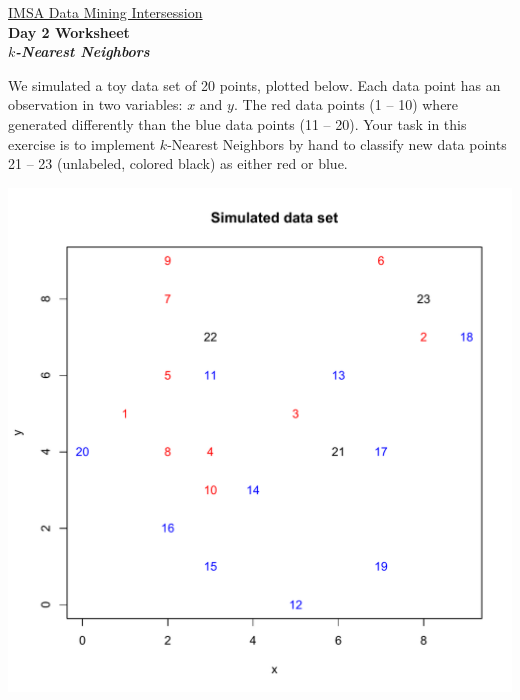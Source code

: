 \documentclass[11pt]{article}
\def\un{\underline}
\begin{document}
\thispagestyle{empty}
\begin{center}
\un{IMSA Data Mining Intersession}\\
\bf{Day 2 Worksheet}\\
\it{$k$-Nearest Neighbors}\\
\end{center}
We simulated a toy data set of 20 points, plotted below. Each data point has an observation in two variables: $x$ and $y$. The red data points (1 -- 10) where generated differently than the blue data points (11 -- 20). Your task in this exercise is to implement $k$-Nearest Neighbors by hand to classify new data points 21 -- 23 (unlabeled, colored black) as either red or blue.
\begin{center}
\includegraphics[scale = 0.6]{plot.pdf}
\hspace{1cm}

\end{center}
\end{document}
